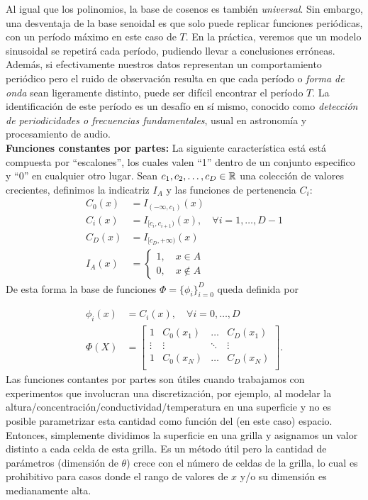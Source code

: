 Al igual que los polinomios, la base de cosenos es también \emph{universal}. Sin embargo, una desventaja de la base senoidal es que solo puede replicar funciones periódicas, con un período máximo en este caso  de $T$. En la práctica, veremos que un modelo sinusoidal se repetirá cada período, pudiendo llevar a conclusiones erróneas. Además, si efectivamente nuestros datos representan un comportamiento periódico pero el ruido de observación resulta en que cada período o \emph{forma de onda} sean ligeramente distinto, puede ser difícil encontrar el período $T$. La identificación de este período es un desafío en sí mismo, conocido como \emph{detección de periodicidades o frecuencias fundamentales}, usual en astronomía y procesamiento de audio. \\

\noindent\textbf{Funciones constantes por partes:} La siguiente característica está está compuesta por ``escalones'', los cuales valen ``1'' dentro de un conjunto especifico y ``0'' en cualquier otro lugar. Sean $c_1,c_2, \ldots,c_D\in{\mathbb R}$ una colección de valores crecientes, definimos la indicatriz $I_A$ y las funciones de pertenencia $C_i$:
\begin{align}
    C_0(x) &= I_{(-\infty,c_1)}(x)\\
    C_i(x) &= I_{[c_i,c_{i+1})}(x), \quad \forall i=1,\ldots,D-1\\
    C_D(x) &= I_{[c_D,+\infty)}(x)\\
    I_A(x) &= \left\{\begin{matrix}
    1,\quad x\in A\\
    0,\quad x\notin A
    \end{matrix}\right. 
\end{align}
De esta forma la base de funciones $\Phi=\{\phi_i\}_{i=0}^D$ queda definida por
    
\begin{align}
    \phi_i(x) &= C_i(x),\quad \forall i=0,\ldots,D\\
    \Phi(X) &= \left[ \begin{matrix}
    1 & C_0(x_1) & \ldots & C_D(x_1)\\
    \vdots & \vdots  & \ddots & \vdots \\
    1 & C_0(x_N) & \ldots & C_D(x_N)\\
    \end{matrix} \right].
\end{align}
Las funciones contantes por partes son útiles cuando trabajamos con experimentos que involucran una discretización, por ejemplo, al modelar la altura/concentración/conductividad/temperatura en una superficie y no es posible parametrizar esta cantidad como función del (en este caso) espacio. Entonces, simplemente dividimos la superficie en una grilla y asignamos un valor distinto a cada celda de esta grilla. Es un método útil pero la cantidad de parámetros (dimensión de $\theta$) crece con el número de celdas de la grilla, lo cual es prohibitivo para casos donde el  rango de valores de $x$ y/o su dimensión es medianamente alta. 
    
